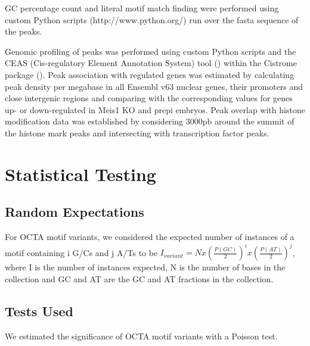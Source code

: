 GC percentage count and literal motif match finding were performed using custom Python scripts (http://www.python.org/) run over the fasta sequence of the peaks.

Genomic profiling of peaks was performed using custom Python scripts and the CEAS (Cis-regulatory Element Annotation System) tool (\cite{Shin2009}) within the Cistrome package (\cite{Liu2011}). Peak association with regulated genes was estimated by calculating peak density per megabase in all Ensembl v63 nuclear genes, their promoters and close intergenic regions and comparing with the corresponding values for genes up- or down-regulated in Meis1 \ac{KO} and \ac{prepi} embryos. Peak overlap with histone modification data was established by considering 3000pb around the summit of the histone mark peaks and intersecting with transcription factor peaks.

\section{Statistical Testing}

\subsection{Random Expectations}

For \ac{OCTA} motif variants, we considered the expected number of instances of a motif containing i G/Cs and j A/Ts to be $I_{variant} = N x {\left(\frac{P(GC)}{2}\right)}^i x {\left(\frac{P(AT)}{2}\right)}^j$, where I is the number of instances expected, N is the number of bases in the collection and GC and AT are the GC and AT fractions in the collection.

\subsection{Tests Used}

We estimated the significance of OCTA motif variants with a Poisson test.


